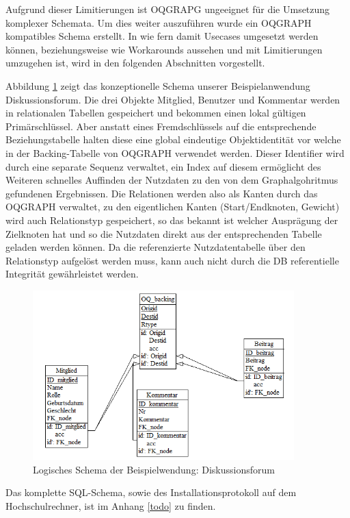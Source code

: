 Aufgrund dieser Limitierungen ist OQGRAPG ungeeignet für die Umsetzung komplexer Schemata. Um dies weiter auszuführen wurde ein OQGRAPH kompatibles Schema erstellt. In wie fern damit Usecases umgesetzt werden können, beziehungsweise wie Workarounds aussehen und mit Limitierungen umzugehen ist, wird in den folgenden Abschnitten vorgestellt.

Abbildung \ref{fig:logicSchema} zeigt das konzeptionelle Schema unserer Beispielanwendung Diskussionsforum. Die drei Objekte Mitglied, Benutzer und Kommentar werden in relationalen Tabellen gespeichert und bekommen einen lokal gültigen Primärschlüssel. Aber anstatt eines Fremdschlüssels auf die entsprechende Beziehungstabelle halten diese eine global eindeutige Objektidentität vor welche in der Backing-Tabelle von OQGRAPH verwendet werden. Dieser Identifier wird durch eine separate Sequenz verwaltet, ein Index auf diesem ermöglicht des Weiteren schnelles Auffinden der Nutzdaten zu den von dem Graphalgohritmus gefundenen Ergebnissen. Die Relationen werden also als Kanten durch das OQGRAPH verwaltet, zu den eigentlichen Kanten (Start/Endknoten, Gewicht) wird auch Relationstyp gespeichert, so das bekannt ist welcher Ausprägung der Zielknoten hat und so die Nutzdaten direkt aus der entsprechenden Tabelle geladen werden können. Da die referenzierte Nutzdatentabelle über den Relationstyp aufgelöst werden muss, kann auch nicht durch die DB referentielle 
Integrität gewährleistet werden.

\begin{figure}	
	\centering
	\includegraphics[width=0.9\textwidth]{images/logischesSchema.png}
	\caption{Logisches Schema der Beispielwendung: Diskussionsforum}
	\label{fig:logicSchema}
\end{figure}
 
Das komplette SQL-Schema, sowie des Installationsprotokoll auf dem Hochschulrechner, ist im Anhang \ref{todo} zu finden.

